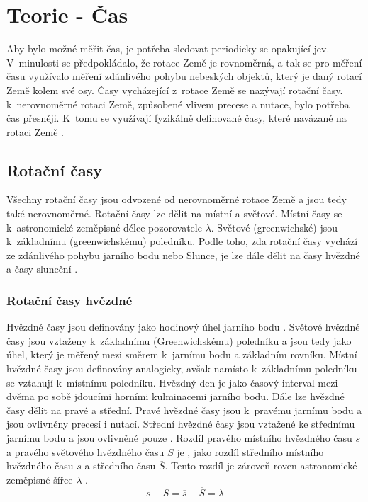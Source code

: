 \chapter{Teorie - Čas}
\label{3-teorie-cas}
Aby bylo možné měřit čas, je potřeba sledovat periodicky se opakující jev. V~minu\-losti se předpokládalo, že rotace Země je rovnoměrná, a tak se pro měření času využívalo měření zdánlivého pohybu nebeských objektů, který je daný rotací Země kolem své osy. Časy vycházející z~rotace Země se nazývají rotační časy.  k~nerovnoměrné rotaci Země, způsobené vlivem precese a nutace, bylo potřeba  čas přesněji. K~tomu se využívají fyzikálně definované časy, které  navázané na rotaci Země \cite{fixel_geodeticka_astronomie}.

\section{Rotační časy}
Všechny rotační časy jsou odvozené od nerovnoměrné rotace Země a jsou tedy také nerovnoměrné. Rotační časy lze dělit na místní a světové. Místní časy se  k~astronomické zeměpisné délce pozorovatele \(\lambda\). Světové (greenwichské) jsou  k~základnímu (greenwichskému) poledníku. Podle toho, zda rotační časy vychází ze zdánlivého pohybu jarního bodu {\Aries} nebo Slunce, je lze dále dělit na časy hvězdné a časy sluneční \cite{kostelecky_geodeticka_astronomie}.

\subsection{Rotační časy hvězdné}%
Hvězdné časy jsou definovány jako hodinový úhel jarního bodu \textbf{\Aries}. %
Světové hvězdné časy jsou vztaženy k~základnímu (Greenwichskému) poledníku a jsou tedy  jako úhel, který je měřený mezi směrem k~jarnímu bodu \textbf{\Aries} a základním   rovníku. Místní hvězdné časy jsou definovány analogicky, avšak namísto k~základnímu poledníku se vztahují k~místnímu poledníku. Hvězdný den je  jako časový interval mezi dvěma po sobě jdoucími horními kulminacemi jarního bodu. Dále lze hvězdné časy dělit na pravé a střední. Pravé hvězdné časy jsou  k~pravému jarnímu bodu a jsou ovlivněny precesí i nutací. Střední hvězdné časy jsou vztažené ke střednímu jarnímu bodu a jsou ovlivněné pouze . Rozdíl pravého místního hvězdného času \(s\) a pravého světového hvězdného času \(S\) je , jako rozdíl středního místního hvězdného času \(\overline{s}\) a středního   času \(\overline{S}\). Tento rozdíl je zároveň roven astronomické zeměpisné šířce   \(\lambda\) \cite{kostelecky_geodeticka_astronomie}.
\begin{equation}
    s-S=\overline{s}-\overline{S}=\lambda
\end{equation}

